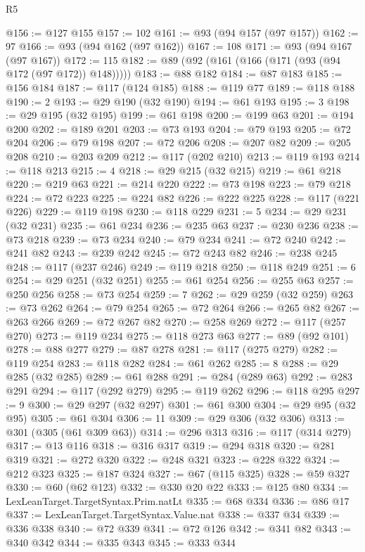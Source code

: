 \begin{lexlean}{R5}
\begin{coremodule}
@156 := @127 @155
@157 := 102
@161 := @93 (@94 @157 (@97 @157))
@162 := 97
@166 := @93 (@94 @162 (@97 @162))
@167 := 108
@171 := @93 (@94 @167 (@97 @167))
@172 := 115
@182 := @89 (@92 (@161 (@166 (@171 (@93 (@94 @172 (@97 @172)) @148)))))
@183 := @88 @182
@184 := @87 @183
@185 := @156 @184
@187 := @117 (@124 @185)
@188 := @119 @77
@189 := @118 @188
@190 := 2
@193 := @29 @190 (@32 @190)
@194 := @61 @193
@195 := 3
@198 := @29 @195 (@32 @195)
@199 := @61 @198
@200 := @199 @63
@201 := @194 @200
@202 := @189 @201
@203 := @73 @193
@204 := @79 @193
@205 := @72 @204
@206 := @79 @198
@207 := @72 @206
@208 := @207 @82
@209 := @205 @208
@210 := @203 @209
@212 := @117 (@202 @210)
@213 := @119 @193
@214 := @118 @213
@215 := 4
@218 := @29 @215 (@32 @215)
@219 := @61 @218
@220 := @219 @63
@221 := @214 @220
@222 := @73 @198
@223 := @79 @218
@224 := @72 @223
@225 := @224 @82
@226 := @222 @225
@228 := @117 (@221 @226)
@229 := @119 @198
@230 := @118 @229
@231 := 5
@234 := @29 @231 (@32 @231)
@235 := @61 @234
@236 := @235 @63
@237 := @230 @236
@238 := @73 @218
@239 := @73 @234
@240 := @79 @234
@241 := @72 @240
@242 := @241 @82
@243 := @239 @242
@245 := @72 @243 @82
@246 := @238 @245
@248 := @117 (@237 @246)
@249 := @119 @218
@250 := @118 @249
@251 := 6
@254 := @29 @251 (@32 @251)
@255 := @61 @254
@256 := @255 @63
@257 := @250 @256
@258 := @73 @254
@259 := 7
@262 := @29 @259 (@32 @259)
@263 := @73 @262
@264 := @79 @254
@265 := @72 @264
@266 := @265 @82
@267 := @263 @266
@269 := @72 @267 @82
@270 := @258 @269
@272 := @117 (@257 @270)
@273 := @119 @234
@275 := @118 @273 @63
@277 := @89 (@92 @101)
@278 := @88 @277
@279 := @87 @278
@281 := @117 (@275 @279)
@282 := @119 @254
@283 := @118 @282
@284 := @61 @262
@285 := 8
@288 := @29 @285 (@32 @285)
@289 := @61 @288
@291 := @284 (@289 @63)
@292 := @283 @291
@294 := @117 (@292 @279)
@295 := @119 @262
@296 := @118 @295
@297 := 9
@300 := @29 @297 (@32 @297)
@301 := @61 @300
@304 := @29 @95 (@32 @95)
@305 := @61 @304
@306 := 11
@309 := @29 @306 (@32 @306)
@313 := @301 (@305 (@61 @309 @63))
@314 := @296 @313
@316 := @117 (@314 @279)
@317 := @13 @116
@318 := @316 @317
@319 := @294 @318
@320 := @281 @319
@321 := @272 @320
@322 := @248 @321
@323 := @228 @322
@324 := @212 @323
@325 := @187 @324
@327 := @67 (@115 @325)
@328 := @59 @327
@330 := @60 (@62 @123)
@332 := @330 @20 @22
@333 := @125 @80
@334 := LexLeanTarget.TargetSyntax.Prim.natLt
@335 := @68 @334
@336 := @86 @17
@337 := LexLeanTarget.TargetSyntax.Value.nat
@338 := @337 @34
@339 := @336 @338
@340 := @72 @339
@341 := @72 @126
@342 := @341 @82
@343 := @340 @342
@344 := @335 @343
@345 := @333 @344

\end{coremodule}
\end{lexlean}
